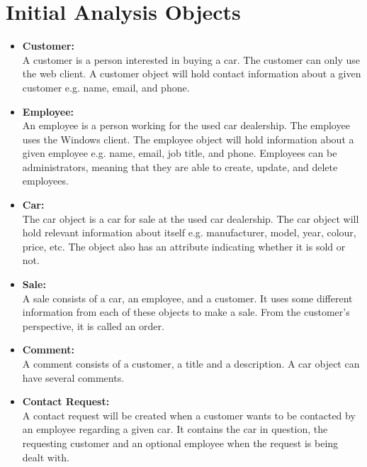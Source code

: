 \section{Initial Analysis Objects}
\begin{itemize}
    \item \textbf{Customer:}\\
    A customer is a person interested in buying a car. The customer can only use the web client. A customer object will hold contact information about a given customer e.g. name, email, and phone.
    \item \textbf{Employee:}\\
    An employee is a person working for the used car dealership. The employee uses the Windows client. The employee object will hold information about a given employee e.g. name, email, job title, and phone. Employees can be administrators, meaning that they are able to create, update, and delete employees.
    \item \textbf{Car:}\\
    The car object is a car for sale at the used car dealership. The car object will hold relevant information about itself e.g. manufacturer, model, year, colour, price, etc. The object also has an attribute indicating whether it is sold or not.
    \item \textbf{Sale:}\\
    A sale consists of a car, an employee, and a customer. It uses some different information from each of these objects to make a sale. From the customer's perspective, it is called an order.
    \item \textbf{Comment:}\\
    A comment consists of a customer, a title and a description. A car object can have several comments.
    \item \textbf{Contact Request:}\\
    A contact request will be created when a customer wants to be contacted by an employee regarding a given car. It contains the car in question, the requesting customer and an optional employee when the request is being dealt with.
\end{itemize}
